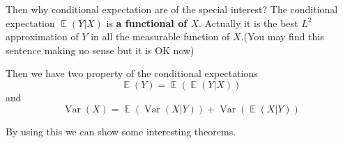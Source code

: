 \documentclass[12pt]{article}
\newcommand{\1}{\mathbbm{1}}
\newcommand{\E}{\operatorname{\mathbb{E}}}
\newcommand{\var}[1]{\operatorname{Var}\left(#1\right)}
\begin{document}
Then why conditional expectation are of the special interest? The conditional expectation $\E (Y|X)$ is \textbf{a functional of $X$}. Actually it is the best $L^2$ approximation of $Y$ in all the measurable function of $X$.(You may find this sentence making no sense but it is OK now)

Then we have two property of the conditional expectations
$$
\E (Y) = \E (\E(Y|X))
$$
and
$$
\var{X} = \E (\var{X|Y}) + \var{\E (X|Y) }
$$

By using this we can show some interesting theorems.



\end{document}
